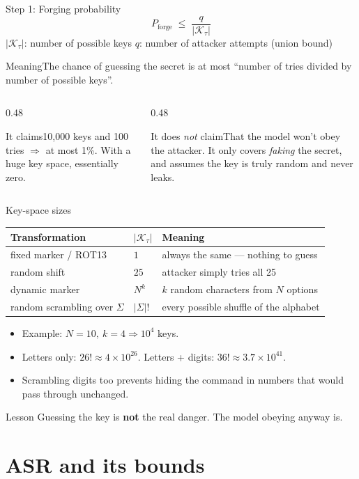\documentclass[aspectratio=169,11pt]{beamer}
\newcommand{\K}{\mathcal{K}_\tau}
\newcommand{\plain}[1]{\begin{block}{Meaning}#1\end{block}}
\newcommand{\claims}[2]{%
  \begin{columns}[T]
    \begin{column}{0.48\textwidth}
      \begin{exampleblock}{It claims}#1\end{exampleblock}
    \end{column}
    \begin{column}{0.48\textwidth}
      \begin{alertblock}{It does \emph{not} claim}#2\end{alertblock}
    \end{column}
  \end{columns}}
\begin{document}
\begin{frame}{Step 1: Forging probability}
  \[
    P_{\text{forge}} \;\le\; \frac{q}{|\K|}
  \]
  \small
  $|\K|$: number of possible keys \quad $q$: number of attacker attempts (union bound)
  \vspace{0.3em}
  \plain{The chance of guessing the secret is at most ``number of tries divided by number of possible keys''.}
  \claims{10{,}000 keys and 100 tries $\Rightarrow$ at most 1\%. With a huge key space, essentially zero.}
  {That the model won't obey the attacker. It only covers \emph{faking} the secret, and assumes the key is truly random and never leaks.}
\end{frame}

\begin{frame}{Key-space sizes}
  \centering
  \begin{tabular}{@{}lll@{}}
    \toprule
    \textbf{Transformation} & $|\K|$ & \textbf{Meaning} \\
    \midrule
    fixed marker / ROT13 & $1$ & always the same --- nothing to guess \\
    random shift & $25$ & attacker simply tries all 25 \\
    dynamic marker & $N^k$ & $k$ random characters from $N$ options \\
    random scrambling over $\Sigma$ & $|\Sigma|!$ & every possible shuffle of the alphabet \\
    \bottomrule
  \end{tabular}
  \vspace{1em}
  \begin{itemize}
    \item Example: $N=10,\ k=4 \Rightarrow 10^4$ keys.
    \item Letters only: $26! \approx 4\times10^{26}$. Letters + digits: $36! \approx 3.7\times10^{41}$.
    \item Scrambling digits too prevents hiding the command in numbers that would pass through unchanged.
  \end{itemize}
  \begin{alertblock}{Lesson}
    Guessing the key is \textbf{not} the real danger. The model obeying anyway is.
  \end{alertblock}
\end{frame}

\section{ASR and its bounds}
\end{document}
